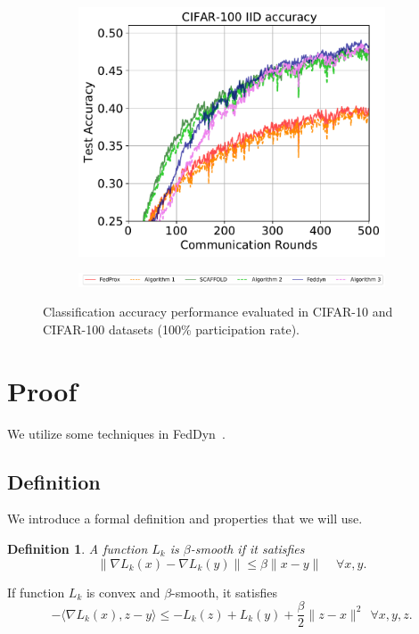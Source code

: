 \documentclass{article} %
\newtheorem{definition}{Definition}[theorem]
\begin{document}
\begin{figure}[ht!]
\begin{subfigure}{.5\textwidth}
  \label{fig:sub25}
\end{subfigure}
\begin{subfigure}{.5\textwidth}
  \centering
  \includegraphics[width=.8\linewidth]{100perfig/cifar100_iid.pdf}
  \label{fig:sub26}
\end{subfigure}
\begin{subfigure}{1\textwidth}
  \centering
  \includegraphics[width=1\linewidth]{textfigure/legend.pdf}
  \label{fig:sub27}
\end{subfigure}
\caption{Classification accuracy performance evaluated in CIFAR-10 and CIFAR-100 datasets (100\% participation rate).}
\label{fig:100peracc2}
\end{figure}


\clearpage
\section{Proof}
We utilize some techniques in FedDyn~\citep{Acar2021federated}. 
\subsection{Definition} \label{append_def}
We introduce a formal definition and properties that we will use.
\begin{definition}
A function $L_k$ is $\beta$-smooth if it satisfies
\begin{equation}\label{smooth1}
    \lVert \nabla L_k(x)- \nabla L_k(y) \rVert \le \beta \lVert x - y \rVert \ \  ~~~  \forall x,y.
\end{equation}
\end{definition}
If function $L_k$ is convex and $\beta$-smooth, it satisfies
\begin{equation}\label{smooth2}
   -\langle\nabla L_k(x), z-y\rangle\le -L_k(z) + L_k(y) + \frac{\beta}{2} \lVert z-x \rVert ^2 \ \    \forall x,y,z.
\end{equation}
\end{document}
